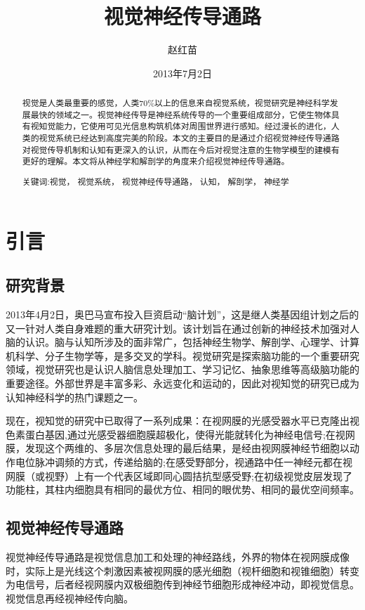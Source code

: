 \documentclass[a4paper,10pt]{article}\large
\title{视觉神经传导通路}
\author{赵红苗}
\date{2013年7月2日}
\begin{document}
\maketitle

\begin{abstract} 
视觉是人类最重要的感觉，人类70\%以上的信息来自视觉系统，视觉研究是神经科学发展最快的领域之一。视觉神经传导是神经系统传导的一个重要组成部分，它使生物体具有视知觉能力，它使用可见光信息构筑机体对周围世界进行感知。经过漫长的进化，人类的视觉系统已经达到高度完美的阶段。本文的主要目的是通过介绍视觉神经传导通路对视觉传导机制和认知有更深入的认识，从而在今后对视觉注意的生物学模型的建模有更好的理解。本文将从神经学和解剖学的角度来介绍视觉神经传导通路。


\begin{description}
\item[关键词:视觉，  视觉系统，  视觉神经传导通路，  认知，  解剖学， 神经学]
\end{description}
\end{abstract}

\newpage
\tableofcontents 
\newpage
\section{引言}
\subsection{研究背景}
2013年4月2日，奥巴马宣布投入巨资启动“脑计划”\cite{1:misc}，这是继人类基因组计划之后的又一针对人类自身难题的重大研究计划。该计划旨在通过创新的神经技术加强对人脑的认识。脑与认知\cite{6:article}所涉及的面非常广，包括神经生物学、解剖学、心理学、计算机科学、分子生物学等，是多交叉的学科。视觉研究是探索脑功能的一个重要研究领域，视觉研究也是认识人脑信息处理加工、学习记忆、抽象思维等高级脑功能的重要途径。外部世界是丰富多彩、永远变化和运动的，因此对视知觉的研究已成为认知神经科学的热门课题之一。


现在，视知觉的研究中已取得了一系列成果\cite{3:misc}：在视网膜的光感受器水平已克隆出视色素蛋白基因,通过光感受器细胞膜超极化，使得光能就转化为神经电信号;在视网膜，发现这个两维的、多层次信息处理的最后结果，是经由视网膜神经节细胞以动作电位脉冲调频的方式，传递给脑的;在感受野部分，视通路中任一神经元都在视网膜（或视野）上有一个代表区域即同心圆拮抗型感受野;在初级视觉皮层发现了功能柱，其柱内细胞具有相同的最优方位、相同的眼优势、相同的最优空间频率。


\subsection{视觉神经传导通路}
视觉神经传导通路是视觉信息加工和处理的神经路线，外界的物体在视网膜成像时，实际上是光线这个刺激因素被视网膜的感光细胞（视杆细胞和视锥细胞）转变为电信号，后者经视网膜内双极细胞传到神经节细胞形成神经冲动，即视觉信息。视觉信息再经视神经传向脑。
\end{document}

